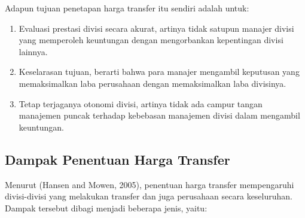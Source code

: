 Adapun tujuan penetapan harga transfer itu sendiri adalah untuk:

\begin{enumerate}
	\item Evaluasi prestasi divisi secara akurat, artinya tidak satupun manajer divisi yang memperoleh keuntungan dengan mengorbankan kepentingan divisi lainnya.
	\item Keselarasan tujuan, berarti bahwa para manajer mengambil keputusan yang memaksimalkan laba perusahaan dengan memaksimalkan laba divisinya.
	\item Tetap terjaganya otonomi divisi, artinya tidak ada campur tangan manajemen puncak terhadap kebebasan manajemen divisi dalam mengambil keuntungan.
\end{enumerate}

\subsection{Dampak Penentuan Harga Transfer}

Menurut (Hansen and Mowen, 2005), penentuan harga transfer mempengaruhi divisi-divisi yang melakukan transfer dan juga perusahaan secara keseluruhan. Dampak tersebut dibagi menjadi beberapa jenis, yaitu:


